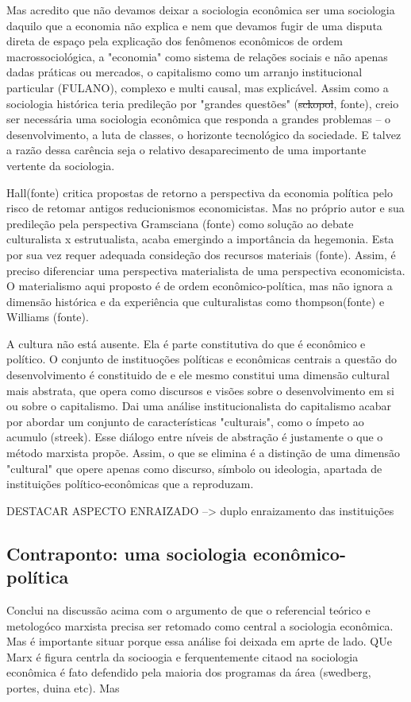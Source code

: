 Mas acredito que não devamos deixar a sociologia econômica ser uma sociologia daquilo que a economia não explica e nem que devamos fugir de uma disputa direta de espaço pela explicação dos fenômenos econômicos de ordem macrossociológica, a "economia" como sistema de relações sociais e não apenas dadas práticas ou mercados, o capitalismo como um arranjo institucional particular (FULANO), complexo e multi causal, mas explicável. Assim como a sociologia histórica teria predileção por "grandes questões" (\sout{sckopol}, fonte), creio ser necessária uma sociologia econômica que responda a grandes problemas -- o desenvolvimento, a luta de classes, o horizonte tecnológico da sociedade. E talvez a razão dessa carência  seja o relativo desaparecimento de uma importante vertente da sociologia.

Hall(fonte) critica propostas de retorno a perspectiva da economia política pelo risco de retomar antigos reducionismos economicistas. Mas no próprio autor e sua predileção pela perspectiva Gramsciana (fonte) como solução ao debate culturalista x estrutualista, acaba emergindo a importância da hegemonia. Esta por sua vez requer adequada consideção dos recursos materiais (fonte). Assim, é preciso diferenciar uma perspectiva materialista de uma perspectiva economicista. O materialismo aqui proposto é de ordem econômico-política, mas não ignora a dimensão histórica e da experiência que culturalistas como thompson(fonte) e Williams (fonte).

A cultura não está ausente. Ela é parte constitutiva do que é econômico e político. O conjunto de instituoções políticas e econômicas centrais a questão do desenvolvimento é constituido de e ele mesmo constitui uma dimensão cultural mais abstrata, que opera como discursos e visões sobre o desenvolvimento em si ou sobre o capitalismo. Dai uma análise institucionalista do capitalismo acabar por abordar um conjunto de características "culturais", como o ímpeto ao acumulo (streek). Esse diálogo entre níveis de abstração é justamente o que o método marxista propõe. Assim, o que se elimina é a distinção de uma dimensão "cultural" que opere apenas como discurso, símbolo ou ideologia, apartada de instituições político-econômicas que a reproduzam.

DESTACAR ASPECTO ENRAIZADO --> duplo enraizamento das instituições


\subsection{Contraponto: uma sociologia econômico-política}
Conclui na discussão acima com o argumento de que o referencial teórico e metologóco marxista precisa ser retomado como central a sociologia econômica. Mas é importante situar porque essa análise foi deixada em aprte de lado. QUe Marx é figura centrla da socioogia e ferquentemente citaod na sociologia econômica é fato defendido pela maioria dos programas da área (swedberg, portes, duina etc). Mas 

